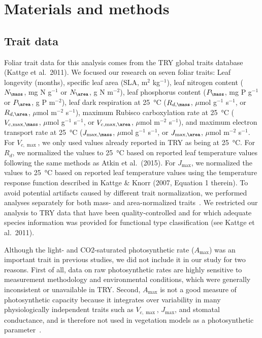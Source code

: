 \section{Materials and methods}\label{sec:mvtraits-methods}

\subsection{Trait data}

Foliar trait data for this analysis comes from the TRY global traits database (Kattge et al.~2011). \nocite{kattge_try_2011}
We focused our research on seven foliar traits:
Leaf longevity (months),
specific leaf area (SLA, m$^2$ kg$^{-1}$),
leaf nitrogen content ($N_{\mass}$, mg N g$^{-1}$ or $N_{\area}$, g N m$^{-2}$),
leaf phosphorus content ($P_{\mass}$, mg P g$^{-1}$ or $P_{\area}$, g P m$^{-2}$),
leaf dark respiration at \SI{25}{\degreeCelsius} ($R_{d,\mass}$, $\mu$mol g$^{-1}$ s$^{-1}$, or $R_{d,\area}$, $\mu$mol m$^{-2}$ s$^{-1}$),
maximum Rubisco carboxylation rate at \SI{25}{\degreeCelsius} ($V_{c,\max,\mass}$, $\mu$mol g$^{-1}$ s$^{-1}$, or $V_{c,\max,\area}$, $\mu$mol m$^{-2}$ s$^{-1}$),
and maximum electron transport rate at \SI{25}{\degreeCelsius} ($J_{\max,\mass}$, $\mu$mol g$^{-1}$ s$^{-1}$, or $J_{\max,\area}$, $\mu$mol m$^{-2}$ s$^{-1}$.
For $V_{c,\max}$, we only used values already reported in TRY as being at \SI{25}{\degreeCelsius}.
For $R_{d}$, we normalized the values to \SI{25}{\degreeCelsius} based on reported leaf temperature values following the same methods as Atkin et al.~(2015). \nocite{atkin_global_2015}
For $J_{\max}$, we normalized the values to \SI{25}{\degreeCelsius} based on reported leaf temperature values using the temperature response function described in Kattge \& Knorr (2007, Equation 1 therein). \nocite{kattge_2007_temperature}
To avoid potential artifacts caused by different trait normalization, we performed analyses separately for both mass- and area-normalized traits~\cite{osnas_global_2013,lloyd_les}.
We restricted our analysis to TRY data that have been quality-controlled and for which adequate species information was provided for functional type classification (see Kattge et al.~2011).\nocite{kattge_try_2011}

Although the light- and CO2-saturated photosynthetic rate ($A_{\max}$) was an important trait in previous studies, we did not include it in our study for two reasons.
First of all, data on raw photosynthetic rates are highly sensitive to measurement methodology and environmental conditions, which were generally inconsistent or unavailable in TRY\@.
Second, $A_{\max}$ is not a good measure of photosynthetic capacity because it integrates over variability in many physiologically independent traits such as $V_{c,\max}$, $J_{\max}$, and stomatal conductance, and is therefore not used in vegetation models as a photosynthetic parameter~\cite{Ali_2015}.

